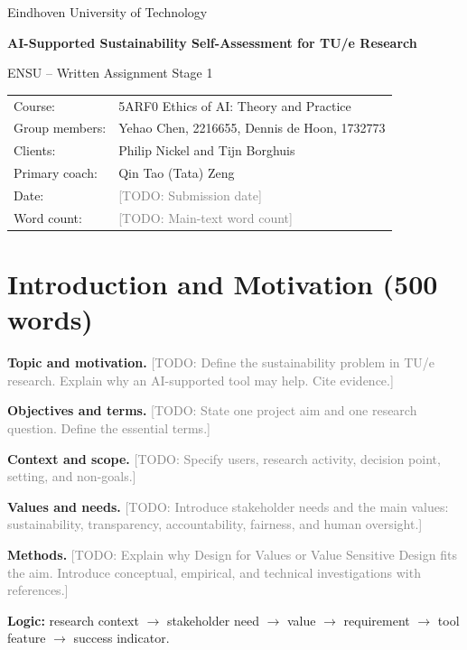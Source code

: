 \documentclass[11pt,a4paper]{article}
\newcommand{\placeholder}[1]{\textcolor{gray}{[TODO: #1]}}
\begin{document}
\begin{titlepage}
\centering
\vspace*{3cm}
{\Large Eindhoven University of Technology\par}
\vspace{1.5cm}
{\huge\bfseries AI-Supported Sustainability Self-Assessment for TU/e Research\par}
\vspace{0.6cm}
{\Large ENSU -- Written Assignment Stage 1\par}
\vfill
\begin{tabular}{@{}ll@{}}
Course: & 5ARF0 Ethics of AI: Theory and Practice \\
Group members: & Yehao Chen, 2216655, Dennis de Hoon, 1732773 \\
Clients: & Philip Nickel and Tijn Borghuis \\
Primary coach: & Qin Tao (Tata) Zeng \\
Date: & \placeholder{Submission date} \\
Word count: & \placeholder{Main-text word count}
\end{tabular}
\vfill
\end{titlepage}

\section{Introduction and Motivation (500 words)}

\textbf{Topic and motivation.}
\placeholder{Define the sustainability problem in TU/e research. Explain why an AI-supported tool may help. Cite evidence.}

\textbf{Objectives and terms.}
\placeholder{State one project aim and one research question. Define the essential terms.}

\textbf{Context and scope.}
\placeholder{Specify users, research activity, decision point, setting, and non-goals.}

\textbf{Values and needs.}
\placeholder{Introduce stakeholder needs and the main values: sustainability, transparency, accountability, fairness, and human oversight.}

\textbf{Methods.}
\placeholder{Explain why Design for Values or Value Sensitive Design fits the aim. Introduce conceptual, empirical, and technical investigations with references.}

\textbf{Logic:} research context $\rightarrow$ stakeholder need $\rightarrow$ value $\rightarrow$ requirement $\rightarrow$ tool feature $\rightarrow$ success indicator.
\end{document}
